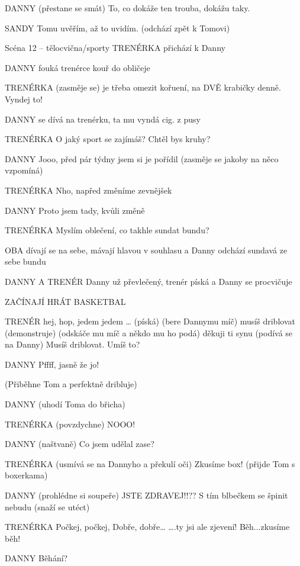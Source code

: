 DANNY         (přestane se smát) To, co dokáže ten trouba, dokážu taky. 

SANDY        Tomu uvěřím, až to uvidím. (odchází zpět k Tomovi) 

Scéna 12 – tělocvična/sporty TRENÉRKA        přichází k Danny 

DANNY        fouká trenérce kouř do obličeje

TRENÉRKA        (zasměje se) je třeba omezit kořuení, na DVĚ krabičky denně. Vyndej to!

DANNY        se dívá na trenérku, ta mu vyndá cig. z pusy 

TRENÉRKA        O jaký sport se zajímáš? Chtěl bys kruhy?

DANNY        Jooo, před pár týdny jsem si je pořídil (zasměje se jakoby na něco                 vzpomíná)

TRENÉRKA        Nho, napřed změníme zevnějšek

DANNY        Proto jsem tady, kvůli změně 

TRENÉRKA        Myslím oblečení, co takhle sundat bundu?  

OBA        dívají se na sebe, mávají hlavou v souhlasu a Danny odchází sundavá        ze sebe bundu

DANNY A TRENÉR         Danny už převlečený, trenér píská a Danny se procvičuje

ZAČÍNAJÍ HRÁT BASKETBAL

TRENÉR        hej, hop, jedem jedem … (píská) (bere Dannymu míč) musíš driblovat         (demonstruje) (odskáče mu míč a někdo mu ho podá) děkuji ti synu                 (podívá se na Danny) Musíš driblovat. Umíš to?

DANNY        Pffff, jasně že jo!

(Přiběhne Tom a perfektně dribluje)

DANNY         (uhodí Toma do břicha)

TRENÉRKA        (povzdychne) NOOO!

DANNY          (naštvaně) Co jsem udělal zase?

TRENÉRKA         (usmívá se na Dannyho a překulí oči)    Zkusíme box! (přijde Tom s                 boxerkama)

DANNY         (prohlédne si soupeře) JSTE ZDRAVEJ!!?? S tím blbečkem se špinit                 nebudu (snaží se utéct)

TRENÉRKA          Počkej, počkej,  Dobře, dobře… ….ty jsi ale zjevení!  Běh...zkusíme běh!

DANNY        Běhání? 

